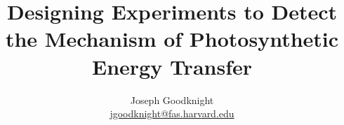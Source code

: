 



\title{Designing Experiments to Detect the Mechanism of Photosynthetic Energy Transfer}
\author{Joseph Goodknight \\ \href{mailto:jgoodknight@fas.harvard.edu}{jgoodknight@fas.harvard.edu} }
%   

\maketitle








